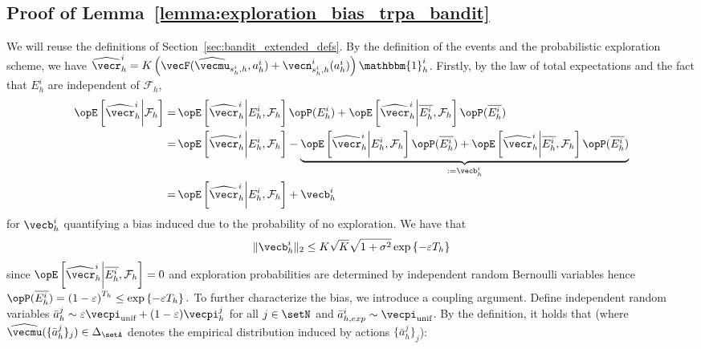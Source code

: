 \subsection{Proof of Lemma~\ref{lemma:exploration_bias_trpa_bandit}}\label{sec:proof_lemma_bandit_exploration_bias}

We will reuse the definitions of Section~\ref{sec:bandit_extended_defs}.
By the definition of the events and the probabilistic exploration scheme, we have $\widehat{\vecr}_h^i = K \left( \vecF(\widehat{\vecmu}_{s_h^{i},h}, a_h^{i}) + \vecn_{s_h^{i},h}^{i}(a_h^{i}) \right) \mathbbm{1}_h^i$.
Firstly, by the law of total expectations and the fact that $E_h^i$ are independent of $\mathcal{F}_h$,
\begin{align*}
    \Exop\left[\widehat{\vecr}_h^i \middle| \mathcal{F}_h\right] = &\Exop\left[\widehat{\vecr}_h^i \middle|E_{h}^i, \mathcal{F}_h\right] \Prob(E_{h}^i) + \Exop\left[\widehat{\vecr}_h^i\middle|\overline{E_{h}^{i}}, \mathcal{F}_h\right] \Prob(\overline{E_{h}^{i}}) \\
    = & \Exop\left[\widehat{\vecr}_h^i \middle|E_{h}^i, \mathcal{F}_h\right] - \underbrace{\Exop\left[\widehat{\vecr}_h^i\middle|E_{h}^{i}, \mathcal{F}_h\right] \Prob(\overline{E_{h}^{i}}) + \Exop\left[\widehat{\vecr}_h^i\middle|\overline{E_{h}^{i}}, \mathcal{F}_h\right] \Prob(\overline{E_{h}^{i}})}_{:=\vecb_h^i} \\
    = & \Exop\left[\widehat{\vecr}_h^i \middle|E_{h}^i, \mathcal{F}_h\right] + \vecb_h^i
\end{align*}
for $\vecb_h^i$ quantifying a bias induced due to the probability of no exploration.
We have that
\begin{align*}
    \| \vecb_h^i \|_2 \leq K\sqrt{K} \sqrt{1 + \sigma^2} \exp\left\{ -\varepsilon T_{h}\right\}
\end{align*}
since $\Exop\left[\widehat{\vecr}_h^i\middle|\overline{E_{h}^{i}}, \mathcal{F}_h\right] = 0$ and exploration probabilities are determined by independent random Bernoulli variables hence $\Prob(\overline{E_{h}^{i}}) = \left( 1 - \varepsilon \right)^{T_h} \leq \exp\left\{ -\varepsilon T_{h}\right\}.$
To further characterize the bias, we introduce a coupling argument.
Define independent random variables $\bar{a}_h^j \sim \varepsilon \vecpi_\text{unif} + (1-\varepsilon) \vecpi_h^j$ for all $j\in\setN$ and $\bar{a}^i_{h, exp} \sim \vecpi_\text{unif}$.
By the definition, it holds that (where $\widehat{\vecmu}(\{ \bar{a}_h ^ j \}_j) \in \Delta_\setA$ denotes the empirical distribution induced by actions $\{ \bar{a}_h ^ j \}_j$):
